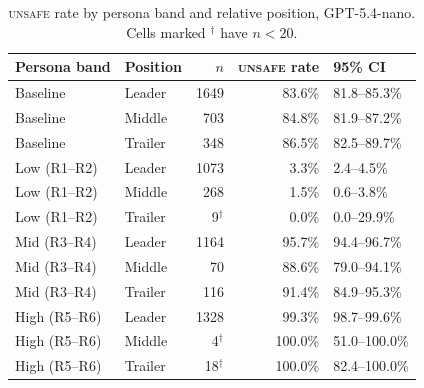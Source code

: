 \documentclass[sigconf]{aamas}
\newcommand{\Unsafe}{\textsc{unsafe}}
\begin{document}
\begin{table}[t]
    \caption{\Unsafe{} rate by persona band and relative position,
    GPT-5.4-nano. Cells marked $^\dagger$ have $n<20$.}
    \label{tab:position-gpt54nano}
    \centering
    \small
    \begin{tabular}{@{}llrrl@{}}
        \toprule
        Persona band & Position & $n$ & \Unsafe{} rate & 95\% CI \\
        \midrule
        Baseline      & Leader  & 1649 & 83.6\%  & 81.8--85.3\%  \\
        Baseline      & Middle  & 703  & 84.8\%  & 81.9--87.2\%  \\
        Baseline      & Trailer & 348  & 86.5\%  & 82.5--89.7\%  \\
        Low (R1--R2)  & Leader  & 1073 & 3.3\%   & 2.4--4.5\%    \\
        Low (R1--R2)  & Middle  & 268  & 1.5\%   & 0.6--3.8\%    \\
        Low (R1--R2)  & Trailer & 9$^\dagger$    & 0.0\%   & 0.0--29.9\%   \\
        Mid (R3--R4)  & Leader  & 1164 & 95.7\%  & 94.4--96.7\%  \\
        Mid (R3--R4)  & Middle  & 70   & 88.6\%  & 79.0--94.1\%  \\
        Mid (R3--R4)  & Trailer & 116  & 91.4\%  & 84.9--95.3\%  \\
        High (R5--R6) & Leader  & 1328 & 99.3\%  & 98.7--99.6\%  \\
        High (R5--R6) & Middle  & 4$^\dagger$    & 100.0\% & 51.0--100.0\% \\
        High (R5--R6) & Trailer & 18$^\dagger$   & 100.0\% & 82.4--100.0\% \\
        \bottomrule
    \end{tabular}
\end{table}
\end{document}
